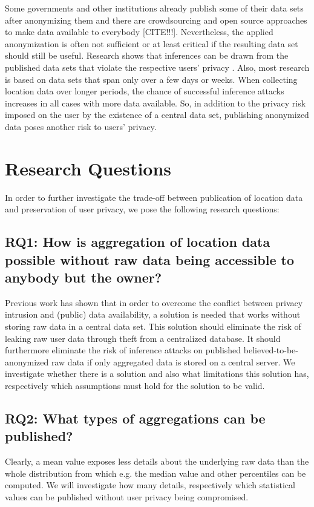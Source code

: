 Some governments and other institutions already publish some of their data sets after anonymizing them 
and there are crowdsourcing and open source approaches to make data available to everybody [CITE!!!]. 
Nevertheless, the applied anonymization is often not sufficient or at least critical if the resulting data set should still be useful. Research shows that inferences can be drawn from the published data sets that violate the respective users' privacy \parencite{cellphone, twitter}. Also, most research is based on data sets that span only over a few days or weeks. When collecting location data over longer periods, the chance of successful inference attacks increases in all cases with more data available. So, in addition to the privacy risk imposed on the user by the existence of a central data set, publishing anonymized data poses another risk to users' privacy.

\section{Research Questions}
In order to further investigate the trade-off between publication of location data and preservation of user privacy, we pose the following research questions:

\subsection*{RQ1: How is aggregation of location data possible without raw data being accessible to anybody but the owner?}
Previous work has shown that in order to overcome the conflict between privacy intrusion and (public) data availability, a solution is needed that works without storing raw data in a central data set.
This solution should eliminate the risk of leaking raw user data through theft from a centralized database. It should furthermore eliminate the risk of inference attacks on published believed-to-be-anonymized raw data if only aggregated data is stored on a central server. We investigate whether there is a solution and also what limitations this solution has, respectively which assumptions must hold for the solution to be valid.

\subsection*{RQ2: What types of aggregations can be published?}
Clearly, a mean value exposes less details about the underlying raw data than the whole distribution from which e.g. the median value and other percentiles can be computed. We will investigate how many details, respectively which statistical values can be published without user privacy being compromised.

